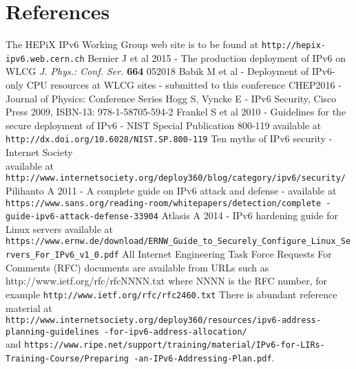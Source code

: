 \section*{References}

\begin{thebibliography}{1}
 The HEPiX IPv6 Working Group web site is to be found at {\tt http://hepix-ipv6.web.cern.ch}
 Bernier J et al 2015 - The production deployment of IPv6 on WLCG  {\it J. Phys.: Conf. Ser.} {\bf664} 052018 
 Babik M et al - Deployment of IPv6-only CPU resources at WLCG sites - submitted to this conference CHEP2016 - Journal of Physics: Conference Series
    Hogg S, Vyncke E - IPv6 Security, Cisco Press 2009, ISBN-13: 978-1-58705-594-2
 Frankel S et al 2010 - Guidelines for the secure deployment of IPv6 - NIST Special Publication 800-119 available at {\tt  http://dx.doi.org/10.6028/NIST.SP.800-119}
 Ten myths of IPv6 security - Internet Society \\ available at {\tt http://www.internetsociety.org/deploy360/blog/category/ipv6/security/}
 Pilihanto A 2011 - A complete guide on IPv6 attack and defense - available at \hfill \break 
  {\tt https://www.sans.org/reading-room/whitepapers/detection/complete \hfill \break -guide-ipv6-attack-defense-33904}
 Atlasis A 2014 - IPv6 hardening guide for Linux servers available at \\
  {\tt https://www.ernw.de/download/ERNW\_Guide\_to\_Securely\_Configure\_Linux\_Servers\_For\_IPv6\_v1\_0.pdf}
 All Internet Engineering Task Force Requests For Comments (RFC) documents are available
from URLs such as http://www.ietf.org/rfc/rfcNNNN.txt where NNNN is the RFC number, for example {\tt http://www.ietf.org/rfc/rfc2460.txt}
 There is abundant reference material at \\
{\tt http://www.internetsociety.org/deploy360/resources/ipv6-address-planning-guidelines \hfill \break -for-ipv6-address-allocation/} \\
and {\tt https://www.ripe.net/support/training/material/IPv6-for-LIRs-Training-Course/Preparing \hfill \break-an-IPv6-Addressing-Plan.pdf}.
\end{thebibliography}
